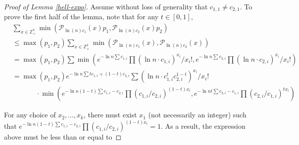\documentclass[11pt]{article}
\newcommand{\mZ}{\mathbb{Z}}
\newcommand{\1}{\mathbb{1}}
\begin{document}
\begin{proof}[Proof of Lemma \ref{hell-expo}]
Assume without loss of generality that $c_{1,1}\ne c_{2,1}$. To prove the first half of the lemma, note that for any $t\in [0,1]$,
\begin{align}
& \sum_{x \in \mZ_+^k} \min(\mathcal{P}_{\ln(n) c_1}(x) p_{1} ,  \mathcal{P}_{\ln(n) c_2}(x) p_{2})\\
&\le \max(p_1,p_2)\sum_{x \in \mZ_+^k} \min(\mathcal{P}_{\ln(n) c_1}(x),  \mathcal{P}_{\ln(n) c_2}(x))\\
&=\max(p_1,p_2)\sum \min(e^{-\ln n\sum c_{1,i}}\prod (\ln n\cdot c_{1,i})^{x_i}/x_i!,e^{-\ln n\sum c_{2,i}}\prod (\ln n\cdot c_{2,i})^{x_i}/x_i!)\\
&=\max(p_1,p_2) e^{-\ln n\sum tc_{1,i}+ (1-t)c_{2,i} }\sum \left(\ln n\cdot c_{1,i}^t c_{2,i}^{1-t}\right)^{x_i}/x_i!\\
&\phantom{xxxxxx}\cdot \min\left(e^{-\ln n(1-t)\sum  c_{1,i}- c_{2,i}}\prod( c_{1,i}/ c_{2,i})^{(1-t)x_i}, e^{-\ln n t\sum  c_{2,i}- c_{1,i}}\prod( c_{2,i}/ c_{1,i})^{tx_i}\right)
\end{align}

For any choice of $x_2,...,x_k$, there must exist $x_1$ (not necessarily an integer) such that $e^{-\ln n(1-t)\sum  c_{1,i}- c_{2,i}}\prod( c_{1,i}/ c_{2,i})^{(1-t)x_i}=1$. As a result, the expression above must be less than or equal to


\end{proof}
\end{document}

